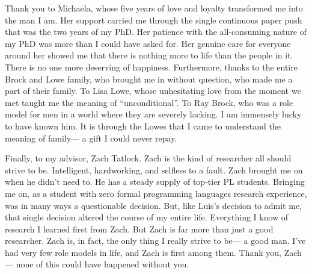 Thank you to Michaela,
  whose five years of love and loyalty transformed me
  into the man I am.
Her support carried me through the single
  continuous paper push
  that was the two years
  of my PhD.
Her patience with the all-consuming nature
  of my PhD
  was more than I could have asked for.
Her genuine care
  for everyone around her
  showed me that there is nothing more to life
  than the people in it.
There is no one more deserving
  of happiness.
Furthermore, thanks to the entire Brock and Lowe family,
  who brought me in
  without question,
  who made me a part of their family.
To Lisa Lowe, whose unhesitating love
  from the moment we met
  taught me the meaning of
  ``unconditional''.
To Ray Brock,
  who was
  a role model for men
  in a world where they are severely lacking.
I am immensely lucky to have known him.
It is through the Lowes
  that I came to understand
  the meaning of family---%
  a gift I could never
  repay.

  
Finally, to my advisor, Zach Tatlock.
Zach is the kind of researcher
  all should strive to be.
Intelligent, hardworking,
  and selfless to a fault.
Zach brought me on
  when he didn't need to.
He has a steady supply
  of top-tier PL students.
Bringing me on, as
  a student with zero formal programming languages
  research experience,
  was in many ways a questionable decision.
But, like Luis's decision to admit me,
  that single decision altered the course
  of my entire life.
Everything I know of research
  I learned first from Zach.
But Zach is far more than just a good researcher.
Zach is, in fact,
  the only thing I really strive to be---%
  a good man.
I've had very few role models in life,
  and Zach is first among them.
Thank you, Zach---%
  none of this could have happened
  without you.